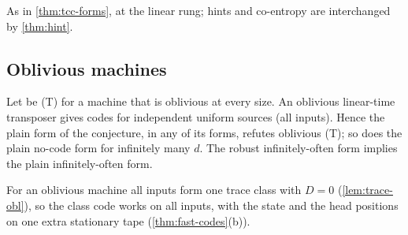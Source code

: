 \begin{outline}
As in \cref{thm:tcc-forms}, at the linear rung; hints and co-entropy are interchanged by
\cref{thm:hint}.
\end{outline}

\subsection{Oblivious machines}

\begin{theorem}\label{thm:oblivious}
Let  be (T) for a machine that is oblivious at every size. An
oblivious linear-time transposer gives codes for independent uniform sources (all inputs). Hence the
plain form of the conjecture, in any of its forms, refutes oblivious (T); so does the plain no-code
form for infinitely many $d$. The robust infinitely-often form implies the plain infinitely-often form.
\end{theorem}

\begin{outline}
For an oblivious machine all inputs form one trace class with $D=0$ (\cref{lem:trace-obl}), so the
class code works on all inputs, with the state and the head positions on one extra stationary tape
(\cref{thm:fast-codes}(b)).
\end{outline}

